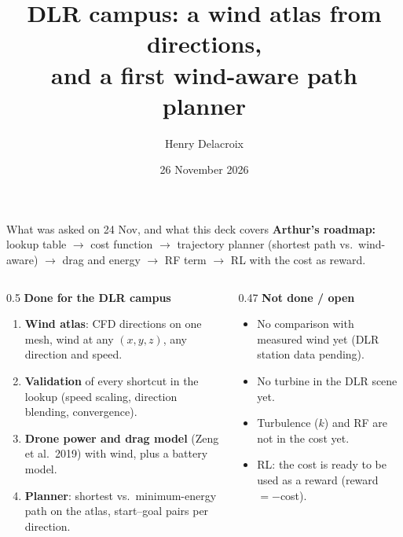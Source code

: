 \documentclass[aspectratio=169,10pt]{beamer}
\title{DLR campus: a wind atlas from \NDirs{} directions,\\and a first wind-aware path planner}
\author{Henry Delacroix}
\institute{Politecnico di Milano, Multidisciplinary Project SWARM-LINK (wind track)}
\date{26 November 2026}
\begin{document}
\begin{frame}
\titlepage
\begin{center}\scriptsize\textit{\BuildStatus}\end{center}
\end{frame}

\begin{frame}{What was asked on 24 Nov, and what this deck covers}
\small
\textbf{Arthur's roadmap:} lookup table $\rightarrow$ cost function $\rightarrow$ trajectory planner
(shortest path vs.\ wind-aware) $\rightarrow$ drag and energy $\rightarrow$ RF term $\rightarrow$ RL with the cost as reward.

\medskip
\begin{columns}[T]
\begin{column}{0.5\textwidth}
\textbf{Done for the DLR campus}
\begin{enumerate}\setlength{\itemsep}{2pt}
  \item \textbf{Wind atlas}: \NDirs{} CFD directions on one mesh, wind at any $(x,y,z)$, any direction and speed.
  \item \textbf{Validation} of every shortcut in the lookup (speed scaling, direction blending, convergence).
  \item \textbf{Drone power and drag model} (Zeng et al.\ 2019) with wind, plus a battery model.
  \item \textbf{Planner}: shortest vs.\ minimum-energy path on the atlas, \NPairs{} start--goal pairs per direction.
\end{enumerate}
\end{column}
\begin{column}{0.47\textwidth}
\textbf{Not done / open}
\begin{itemize}\setlength{\itemsep}{2pt}
  \item No comparison with measured wind yet (DLR station data pending).
  \item No turbine in the DLR scene yet.
  \item Turbulence ($k$) and RF are not in the cost yet.
  \item RL: the cost is ready to be used as a reward (reward $=-$cost).
\end{itemize}
\end{column}
\end{columns}
\end{frame}
\end{document}
